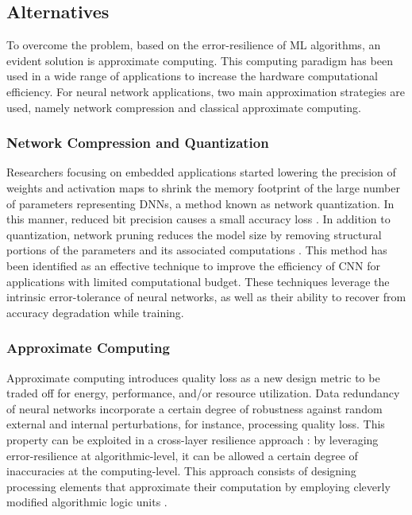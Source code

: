 \subsection{Alternatives}
To overcome the problem, based on the error-resilience of ML algorithms, an evident solution is approximate computing. This computing paradigm has been used in a wide range of applications to increase the hardware computational efficiency\cite{han2013approximate}. For neural network applications, two main approximation strategies are used, namely network compression and classical approximate computing\cite{bouvier2019spiking}.

\subsubsection{Network Compression and Quantization}
Researchers focusing on embedded applications started lowering the precision of weights and activation maps to shrink the memory footprint of the large number of parameters representing DNNs, a method known as network quantization. In this manner, reduced bit precision causes a small accuracy loss \cite{courbariaux2015binaryconnect, han2015deep, hubara2017quantized, rastegari2016xnor}. In addition to quantization, network pruning reduces the model size by removing structural portions of the parameters and its associated computations \cite{lecun1989optimal,hassibi1992second}. This method has been identified as an effective technique to improve the efficiency of CNN for applications with limited computational budget\cite{molchanov2016pruning,li2016pruning, liu2018rethinking}. These techniques leverage the intrinsic error-tolerance of neural networks, as well as their ability to recover from accuracy degradation while training.

\subsubsection{Approximate Computing}
Approximate computing introduces quality loss as a new design metric to be traded off for energy, performance, and/or resource utilization. Data redundancy of neural networks incorporate a certain degree of robustness against random external and internal perturbations, for instance, processing quality loss. This property can be exploited in a cross-layer resilience approach \cite{carter2010design}: by leveraging error-resilience at algorithmic-level, it can be allowed a certain degree of inaccuracies at the computing-level. This approach consists of designing processing elements that approximate their computation by employing cleverly modified algorithmic logic units \cite{han2013approximate}. 

